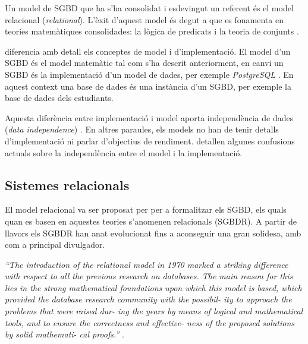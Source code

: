 Un model de SGBD que ha s'ha consolidat i esdevingut un referent és el
model relacional (\emph{relational}). L'èxit d'aquest model és degut a
que es fonamenta en teories matemàtiques consolidades: la lògica de
predicats i la teoria de conjunts \parencite{date:introduction}.



\textcite{date:introduction} diferencia amb detall els conceptes de
model i d'implementació.  El model d'un SGBD és el model matemàtic tal
com s'ha descrit anteriorment, en canvi un SGBD és la implementació
d'un model de dades, per exemple \emph{PostgreSQL} \parencite{postgresql}.
En aquest context una base de dades és una instància d'un SGBD,
per exemple la base de dades dels estudiants.


Aquesta diferència entre implementació i model aporta independència de dades (\emph{data independence}) \parencite{date:dictionary}. En altres paraules, els models no han de tenir detalls d'implementació ni parlar d'objectius de rendiment. 
\textcite{dbdebunk} detallen algunes confusions actuals sobre la independència entre el model i la implementació.







\subsection{Sistemes relacionals}
\label{sec:estat:sgbdr}

El model relacional va ser proposat per \textcite{codd70} per a
formalitzar els SGBD, els quals quan es basen en aquestes teories
s'anomenen relacionals (SGBDR). A partir de llavors els SGBDR han anat
evolucionat fins a aconseguir una gran solidesa, amb
\textcite{date:introduction,date06,date:dictionary} com a principal
divulgador.


\todo{}
\emph{``The introduction of the relational model in 1970
marked a striking difference with respect to all the
previous research on databases. The main reason
for this lies in the strong mathematical foundations
upon which this model is based, which provided
the database research community with the possibil-
ity to approach the problems that were raised dur-
ing the years by means of logical and mathematical
tools, and to ensure the correctness and effective-
ness of the proposed solutions by solid mathemati-
cal proofs.''} \textcite{atzeni13:relational_model_dead}.






